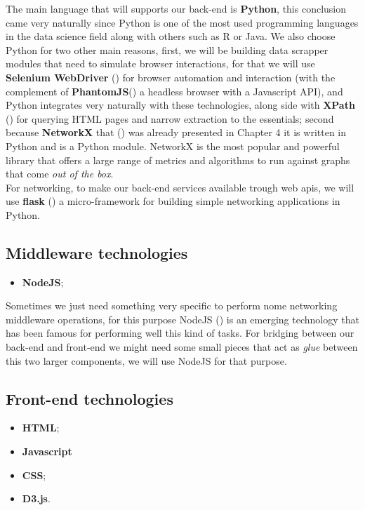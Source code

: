 The main language that will supports our back-end is \textbf{Python}, this conclusion came very naturally since Python is one of the most used programming languages in the data science field along with others such as R or Java. We also choose Python for two other main reasons, first, we will be building data scrapper modules that need to simulate browser interactions, for that we will use \textbf{Selenium WebDriver} (\cite{documentation2013selenium}) for browser automation and interaction (with the complement of \textbf{PhantomJS}(\cite{hidayat2013phantomjs}) a headless browser with a Javascript API), and Python integrates very naturally with these technologies, along side with \textbf{XPath} (\cite{clark1999xml}) for querying HTML pages and narrow extraction to the essentials; second because \textbf{NetworkX} that (\cite{hagberg2013networkx}) was already presented in Chapter 4 it is written in Python and is a Python module. NetworkX is the most popular and powerful library that offers a large range of metrics and algorithms to run against graphs that come \textit{out of the box}.\\
\indent For networking, to make our back-end services available trough web \glspl{api}, we will use \textbf{flask} (\cite{ronacher2015flask}) a micro-framework for building simple networking applications in Python.

\subsection{Middleware technologies}
\begin{itemize}
    \item \textbf{NodeJS};
\end{itemize}

Sometimes we just need something very specific to perform nome networking middleware operations, for this purpose NodeJS (\cite{nodejs}) is an emerging technology
that has been famous for performing well this kind of tasks. For bridging between our back-end and front-end we might need some small pieces that act
as \textit{glue} between this two larger components, we will use NodeJS for that purpose.

\subsection{Front-end technologies}
\begin{itemize}
    \item \textbf{HTML};
    \item \textbf{Javascript}
    \item \textbf{CSS};
    \item \textbf{D3.js}.
\end{itemize}

